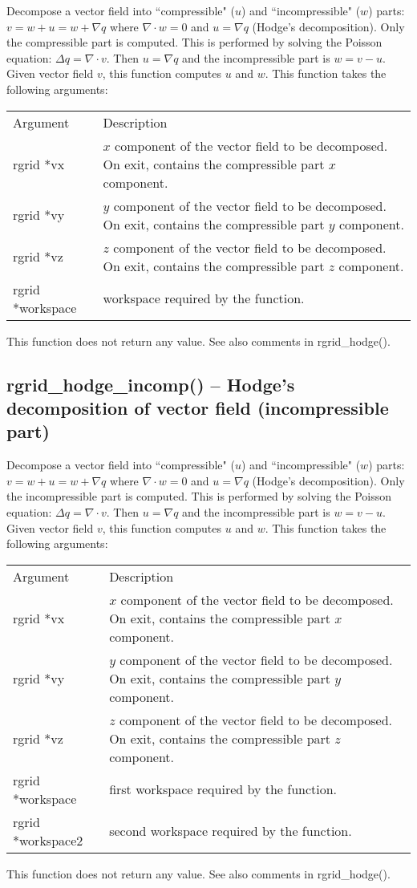 \documentclass[12pt,letterpaper]{report}
\begin{document}
Decompose a vector field into ``compressible" ($u$) and ``incompressible" ($w$) parts: $v = w + u = w + \nabla q$ where $\nabla\cdot w = 0$ and $u = \nabla q$ (Hodge's decomposition). Only the compressible part is computed. This is performed by solving the Poisson equation: $\Delta q = \nabla\cdot v$. Then $u = \nabla q$ and the incompressible part is $w = v - u$. Given vector field $v$, this function computes $u$ and $w$. This function takes the following arguments:
\begin{longtable}{p{} p{}}
Argument & Description\\
\cline{1-2}
rgrid *vx & $x$ component of the vector field to be decomposed. On exit, contains the compressible part $x$ component.\\
rgrid *vy & $y$ component of the vector field to be decomposed. On exit, contains the compressible part $y$ component.\\
rgrid *vz & $z$ component of the vector field to be decomposed. On exit, contains the compressible part $z$ component.\\
rgrid *workspace & workspace required by the function.\\
\end{longtable}
\noindent
This function does not return any value. See also comments in rgrid\_hodge().

\subsection{rgrid\_hodge\_incomp() -- Hodge's decomposition of vector field (incompressible part)}

Decompose a vector field into ``compressible" ($u$) and ``incompressible" ($w$) parts: $v = w + u = w + \nabla q$ where $\nabla\cdot w = 0$ and $u = \nabla q$ (Hodge's decomposition). Only the incompressible part is computed. This is performed by solving the Poisson equation: $\Delta q = \nabla\cdot v$. Then $u = \nabla q$ and the incompressible part is $w = v - u$. Given vector field $v$, this function computes $u$ and $w$. This function takes the following arguments:
\begin{longtable}{p{} p{}}
Argument & Description\\
\cline{1-2}
rgrid *vx & $x$ component of the vector field to be decomposed. On exit, contains the compressible part $x$ component.\\
rgrid *vy & $y$ component of the vector field to be decomposed. On exit, contains the compressible part $y$ component.\\
rgrid *vz & $z$ component of the vector field to be decomposed. On exit, contains the compressible part $z$ component.\\
rgrid *workspace & first workspace required by the function.\\
rgrid *workspace2 & second workspace required by the function.\\
\end{longtable}
\noindent
This function does not return any value. See also comments in rgrid\_hodge().
\end{document}
